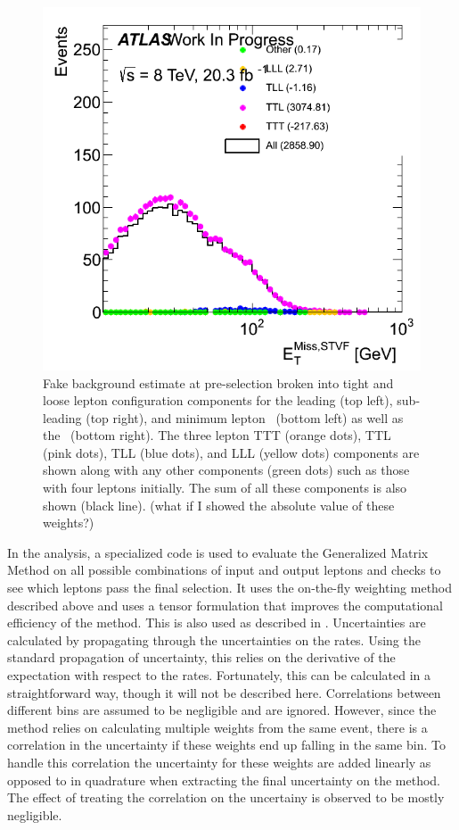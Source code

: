 \begin{figure}
\includegraphics[width=.45\columnwidth]{figures/CompareMxMComponents/ChargeSameSign_PreselCustomRates_Mar19/png/MET_Et_STVF.png}
\caption{Fake background estimate at pre-selection broken
into tight and loose lepton configuration components for the 
leading (top left), sub-leading (top right), and minimum lepton \pt~(bottom left)
as well as the \met~(bottom right). The three lepton TTT (orange dots),
TTL (pink dots), TLL (blue dots), and LLL (yellow dots) components
are shown along with any other components (green dots) such as those
with four leptons initially.  The sum of all these components is also
shown (black line). (what if I showed the absolute value of these weights?)}
\label{fig:mxm_components}
\end{figure}


In the analysis, a specialized code is used to evaluate the 
Generalized Matrix Method
on all possible combinations of input and output leptons and checks
to see which leptons pass the final selection. 
It uses the on-the-fly
weighting method described above and uses a tensor
formulation that improves the computational efficiency of the method.
This is also used as described in \cite{Gillam:2014xua}.
Uncertainties are calculated by propagating through 
the uncertainties on the rates. 
Using the standard propagation of uncertainty, this relies
on the derivative of the expectation with respect to the rates.
Fortunately, this can be calculated in a straightforward way,
though it will not be described here.
Correlations between different bins are assumed to be negligible and 
are ignored.  However, since the method relies on calculating multiple
weights from the same event, there is a correlation in the uncertainty
if these weights end up falling in the same bin. To handle this 
correlation the uncertainty for these weights are added linearly 
as opposed to in quadrature when extracting the final uncertainty 
on the method. The effect of treating the correlation on the uncertainy is observed to
be mostly negligible.

